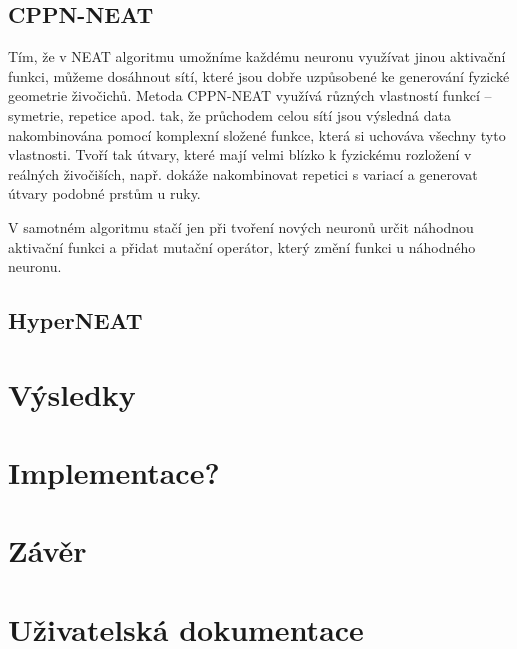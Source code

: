 \documentclass[a4]{article}
\begin{document}
\subsection{CPPN-NEAT}
Tím, že v NEAT algoritmu umožníme každému neuronu využívat jinou aktivační funkci, můžeme dosáhnout sítí, které jsou dobře uzpůsobené ke generování fyzické geometrie živočichů. Metoda CPPN-NEAT\cite{cppn-neat} využívá různých vlastností funkcí -- symetrie, repetice apod. tak, že průchodem celou sítí jsou výsledná data nakombinována pomocí komplexní složené funkce, která si uchováva všechny tyto vlastnosti. Tvoří tak útvary, které mají velmi blízko k fyzickému rozložení v reálných živočiších, např. dokáže nakombinovat repetici s variací a generovat útvary podobné prstům u ruky.\par
V samotném algoritmu stačí jen při tvoření nových neuronů určit náhodnou aktivační funkci a přidat mutační operátor, který změní funkci u náhodného neuronu.\par
\begin{figure}\end{figure}
\subsection{HyperNEAT}

\section{Výsledky} 
\section{Implementace?}%
\section{Závěr} 
\section{Uživatelská dokumentace} 
\end{document}
